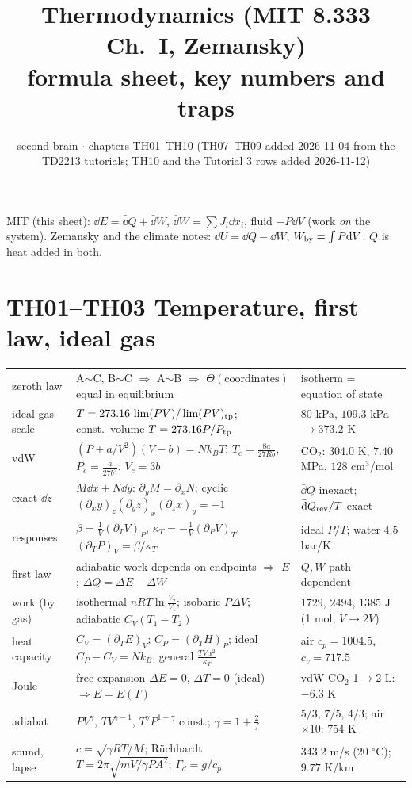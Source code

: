 \documentclass[9pt]{article}
\title{Thermodynamics (MIT 8.333 Ch.~I, Zemansky)\\\large formula sheet, key numbers and traps}
\author{second brain $\cdot$ chapters TH01--TH10 (TH07--TH09 added 2026-11-04 from the TD2213 tutorials; TH10 and the Tutorial 3 rows added 2026-11-12)}
\date{}
\begin{document}
\maketitle
\vspace{-2.2em}

\begin{keybox}
MIT (this sheet): $\dd E=\bar{\dd}Q+\bar{\dd}W$, $\bar{\dd}W=\sum J_i\dd x_i$, fluid $-P\dd V$ (work \emph{on} the system). Zemansky and the climate notes: $\dd U=\bar{\dd}Q-\bar{\dd}W$, $W_{\rm by}=\int P\mathrm{d} V$. $Q$ is heat added in both.
\end{keybox}

\section*{TH01--TH03 Temperature, first law, ideal gas}
\begin{tabular}{@{}p{2.9cm}p{8.4cm}p{6.1cm}@{}}
\toprule
zeroth law & A$\sim$C, B$\sim$C $\Rightarrow$ A$\sim$B $\Rightarrow$ $\Theta(\text{coordinates})$ equal in equilibrium & isotherm = equation of state\\
ideal-gas scale & $T=273.16\,\lim(PV)/\lim(PV)_{\rm tp}$; const.\ volume $T=273.16P/P_{\rm tp}$ & $80$ kPa, $109.3$ kPa $\to373.2$ K\\
vdW & $(P+a/V^2)(V-b)=Nk_BT$; $T_c=\tfrac{8a}{27Rb}$, $P_c=\tfrac a{27b^2}$, $V_c=3b$ & CO$_2$: $304.0$ K, $7.40$ MPa, $128$ cm$^3$/mol\\
exact $\dd z$ & $M\dd x+N\dd y$: $\partial_yM=\partial_xN$; cyclic $(\partial_xy)_z(\partial_yz)_x(\partial_zx)_y=-1$ & $\bar{\dd}Q$ inexact; $\bar{\mathrm{d}}Q_{\rm rev}/T$ exact\\
responses & $\beta=\tfrac1V(\partial_TV)_P$, $\kappa_T=-\tfrac1V(\partial_PV)_T$, $(\partial_TP)_V=\beta/\kappa_T$ & ideal $P/T$; water $4.5$ bar/K\\
first law & adiabatic work depends on endpoints $\Rightarrow$ $E$; $\Delta Q=\Delta E-\Delta W$ & $Q,W$ path-dependent\\
work (by gas) & isothermal $nRT\ln\tfrac{V_2}{V_1}$; isobaric $P\Delta V$; adiabatic $C_V(T_1-T_2)$ & $1729$, $2494$, $1385$ J (1 mol, $V\to2V$)\\
heat capacity & $C_V=(\partial_TE)_V$; $C_P=(\partial_TH)_P$; ideal $C_P-C_V=Nk_B$; general $\tfrac{TV\alpha^2}{\kappa_T}$ & air $c_p=1004.5$, $c_v=717.5$\\
Joule & free expansion $\Delta E=0$, $\Delta T=0$ (ideal) $\Rightarrow E=E(T)$ & vdW CO$_2$ 1$\to$2 L: $-6.3$ K\\
adiabat & $PV^\gamma$, $TV^{\gamma-1}$, $T^\gamma P^{1-\gamma}$ const.; $\gamma=1+\tfrac2f$ & $5/3$, $7/5$, $4/3$; air $\times10$: $754$ K\\
sound, lapse & $c=\sqrt{\gamma RT/M}$; R\"uchhardt $T=2\pi\sqrt{mV/\gamma PA^2}$; $\Gamma_d=g/c_p$ & $343.2$ m/s (20 $^\circ$C); $9.77$ K/km\\
\bottomrule
\end{tabular}
\end{document}
